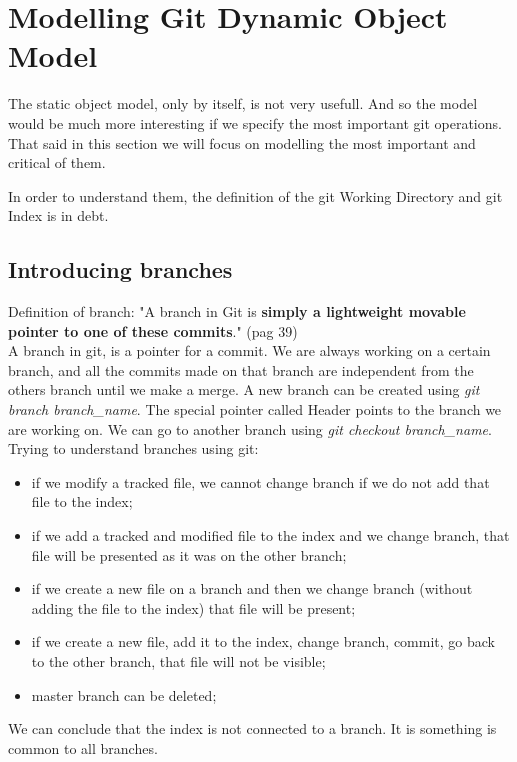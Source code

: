 \section {Modelling Git Dynamic Object Model}
The static object model, only by itself, 
is not very usefull. And so
the model would be much more interesting if we specify 
the most important git operations. That said in this
section we will focus on modelling the most important
and critical of them. \par

In order to understand them, the definition
of the git Working Directory and git Index is in debt.

\subsection{Introducing branches}
Definition of branch: "A branch in Git is {\bf simply a lightweight movable pointer to one of these commits}." \cite{progit} (pag 39)\\
A branch in git, is a pointer for a commit. We are always working on a certain branch, and all the commits made on that branch are independent from the others branch until we make a merge. A new branch can be created using \emph{git branch branch\_name}. The special pointer called Header points to the branch we are working on. We can go to another branch using \emph{git checkout branch\_name}.\\



Trying to understand branches using git:
\begin{itemize}
   \item if we modify a tracked file, we cannot change branch if we do not add that file to the index;
   \item if we add a tracked and modified file to the index and we change branch, that file will be presented as it was on the other branch;
   \item if we create a new file on a branch and then we change branch (without adding the file to the index) that file will be present;
   \item if we create a new file, add it to the index, change branch, commit, go back to the other branch, that file will not be visible;
   \item master branch can be deleted;
\end{itemize}

We can conclude that the index is not connected to a branch. It is something is common to all branches.


